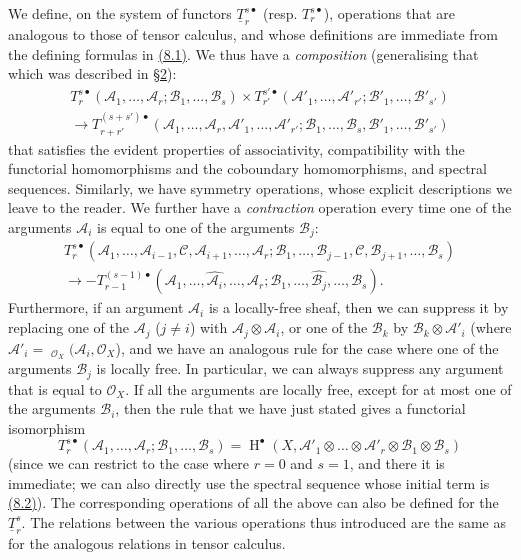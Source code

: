 \documentclass{article}
\newcommand{\scr}[1]{{\mathscr{#1}}}
\DeclareMathOperator{\shHom}{\underline{Hom}}
\DeclareMathOperator{\HH}{H}
\newcommand{\oldpage}[1]{\marginpar{\footnotesize$\Big\vert$ \textit{p.~#1}}}
\begin{document}
We define, on the system of functors $\underline{T}_r^{s\bullet}$ (resp. $T_r^{s\bullet}$), operations that are analogous to those of tensor calculus, and whose definitions are immediate from the defining formulas in \hyperref[8.1]{(8.1)}.
We thus have a \emph{composition} (generalising that which was described in \hyperref[section2]{\S2}):
\[
\label{8.3}
  \begin{gathered}
    T_r^{s\bullet}(\scr{A}_1,\ldots,\scr{A}_r;\scr{B}_1,\ldots,\scr{B}_s)
    \times T_{r'}^{s'\bullet}(\scr{A}'_1,\ldots,\scr{A}'_{r'};\scr{B}'_1,\ldots,\scr{B}'_{s'})
  \\\to T_{r+r'}^{(s+s')\bullet}(\scr{A}_1,\ldots,\scr{A}_r,\scr{A}'_1,\ldots,\scr{A}'_{r'};\scr{B}_1,\ldots,\scr{B}_s,\scr{B}'_1,\ldots,\scr{B}'_{s'})
  \end{gathered}
\tag{8.3}
\]
that satisfies the evident properties of associativity, compatibility with the functorial homomorphisms and the coboundary homomorphisms, and spectral sequences.
Similarly, we have symmetry operations, whose explicit descriptions we leave to the reader.
We further have a \emph{contraction} operation every time one of the arguments $\scr{A}_i$
\oldpage{149-23}
is equal to one of the arguments $\scr{B}_j$:
\[
\label{8.4}
  \begin{gathered}
    T_r^{s\bullet}(\scr{A}_1,\ldots,\scr{A}_{i-1},\scr{C},\scr{A}_{i+1},\ldots,\scr{A}_r;\scr{B}_1,\ldots,\scr{B}_{j-1},\scr{C},\scr{B}_{j+1},\ldots,\scr{B}_s)
  \\\to -T_{r-1}^{(s-1)\bullet}(\scr{A}_1,\ldots,\widehat{\scr{A}_i},\ldots,\scr{A}_r;\scr{B}_1,\ldots,\widehat{\scr{B}_j},\ldots,\scr{B}_s).
  \end{gathered}
\tag{8.4}
\]
Furthermore, if an argument $\scr{A}_i$ is a locally-free sheaf, then we can suppress it by replacing one of the $\scr{A}_j$ ($j\neq i$) with $\scr{A}_j\otimes\scr{A}_i$, or one of the $\scr{B}_k$ by $\scr{B}_k\otimes\scr{A}'_i$ (where $\scr{A}'_i=\shHom_{\scr{O}_X}(\scr{A}_i,\scr{O}_X$), and we have an analogous rule for the case where one of the arguments $\scr{B}_j$ is locally free.
In particular, we can always suppress any argument that is equal to $\scr{O}_X$.
If all the arguments are locally free, except for at most one of the arguments $\scr{B}_i$, then the rule that we have just stated gives a functorial isomorphism
\[
\label{8.5}
  T_r^{s\bullet}(\scr{A}_1,\ldots,\scr{A}_r;\scr{B}_1,\ldots,\scr{B}_s)
  = \HH^\bullet(X,\scr{A}'_1\otimes\ldots\otimes\scr{A}'_{r}\otimes\scr{B}_1\otimes\scr{B}_s)
\tag{8.5}
\]
(since we can restrict to the case where $r=0$ and $s=1$, and there it is immediate; we can also directly use the spectral sequence whose initial term is \hyperref[8.2]{(8.2)}).
The corresponding operations of all the above can also be defined for the $\underline{T}_r^s$.
The relations between the various operations thus introduced are the same as for the analogous relations in tensor calculus.
\end{document}
